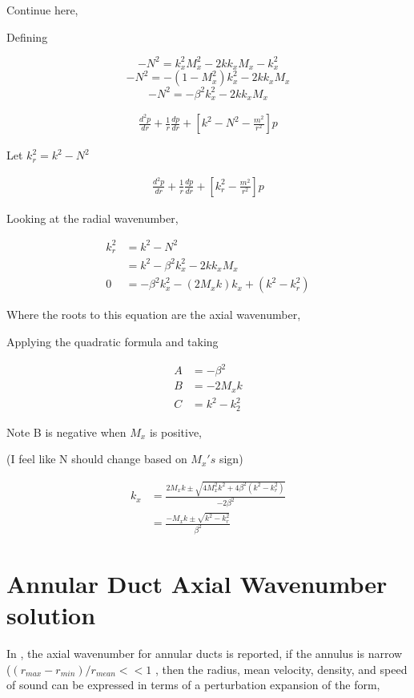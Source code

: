 \documentclass[a4paper]{article}
\begin{document}
Continue here,


Defining 

$$- N^2 = k_x^2 M_x^2 - 2 k k_x M_x - k_x^2 $$
$$-N^2 = -(1 -  M_x^2)k_x^2 - 2 k k_x M_x  $$
$$-N^2 =  -\beta^2 k_x^2 - 2 k k_x M_x  $$


\begin{align*}
    \frac{ d^2 p}{d r} +
    \frac{1}{r} 
    \frac{d p}{d r} + \left[ 
    k^2 - N^2 - \frac{m^2}{r^2}  \right]p 
\end{align*}

Let $k_r^2 = k^2 - N^2$


\begin{align*}
    \frac{ d^2 p}{d r} +
    \frac{1}{r} 
    \frac{d p}{d r} + \left[ 
    k_r^2  - \frac{m^2}{r^2}  \right]p 
\end{align*}

Looking at the radial wavenumber,

\begin{align*}
    k_r^2 &= k^2 - N^2 \\
          &= k^2-\beta^2 k_x^2 - 2 k k_x M_x \\
    0 &=  -\beta ^2 k_x ^2 -  \left( 2M_x k \right)k_x +(k^2 - k_r^2)
\end{align*}

Where the roots to this equation are the axial wavenumber,


Applying the quadratic formula and taking 

\begin{align*}
    A &= - \beta^2 \\
    B &= - 2M_x k\\
    C &= k^2 - k_2^2
\end{align*} 

Note B is negative when $M_x$ is positive,

(I feel like N should change based on $M_x's$ sign)

\begin{align*}
    k_x &= \frac{2M_x k \pm \sqrt{4 M_x^2 k^2 + 4 \beta^2 \left( k^2 - k_r^2 \right)}}{-2\beta^2}\\
        &= \frac{-M_x k \pm \sqrt{k^2 - k_r^2}}{\beta^2}
\end{align*}

\section{Annular Duct Axial Wavenumber solution}


In \cite{Amr2001}, the axial wavenumber for annular ducts is reported, if the 
annulus is narrow ($(r_{max} - r_{min})/r_{mean} << 1$ , then the radius, mean
velocity, density, and speed of sound can be expressed in terms of a perturbation
expansion of the form,
\end{document}
